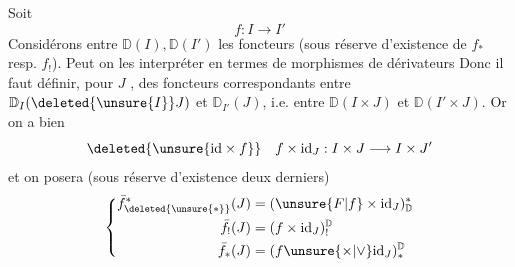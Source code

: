 Soit
\[
f:I\longrightarrow I'
\]
Considérons entre $\mathbb D(I),\mathbb D(I')$ les foncteurs
(sous réserve d'existence de $f_*$ resp. $f_!$). Peut on les interpréter en termes de morphismes de dérivateurs
Donc il faut définir, pour  $J$ , des foncteurs correspondants entre $\mathbb D_I(\deleted{\unsure{I}}J)$ et $\mathbb D_{I'}(J)$, i.e. entre $\mathbb D(I\times J)$ et $\mathbb D(I'\times J)$. Or on a bien
\[
\deleted{\unsure{\mathrm{id}\times f}} \quad f\times\mathrm{id}_J:I\times J\longrightarrow I\times J'
\]
et on posera (sous réserve d'existence  deux derniers)
\[
\left\{\begin{aligned}
\bar f^{*}_{\deleted{\unsure{*}}}(J)&=(\unsure{F|f}\times\mathrm{id}_J)^*_{\mathbb D}\\
\bar f_!(J)&=(f\times\mathrm{id}_J)^{\mathbb D}_!\\
\bar f_*(J)&=(f\unsure{\times|\vee}\mathrm{id}_J)^{\mathbb D}_*
\end{aligned}\right.
\]
